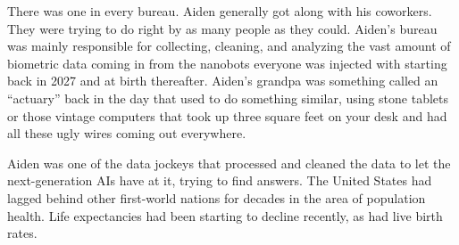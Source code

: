 \documentclass[11pt]{book}
\begin{document}
	There was one in every bureau. Aiden generally got along with his coworkers. They were trying to do right by as many people as they could. Aiden's bureau was mainly responsible for collecting, cleaning, and analyzing the vast amount of biometric data coming in from the nanobots everyone was injected with starting back in 2027 and at birth thereafter. Aiden's grandpa was something called an ``actuary'' back in the day that used to do something similar, using stone tablets or 
	those vintage computers that took up three square feet on your desk and had all these ugly wires coming out everywhere.
	
	Aiden was one of the data jockeys that processed and cleaned the data to let the next-generation AIs have at it, trying to find answers. The United States had lagged behind other first-world nations for decades in the area of population health. Life expectancies had been starting to decline recently, as had live birth rates.  
	
\end{document}
